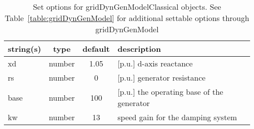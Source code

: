 \begin{table}[ht]
\centering
\begin{tabular}{p{5cm} c c p{7cm}}
\hline
string(s) & type & default & description \\
\hline
xd & number & 1.05 & [p.u.] d-axis reactance\\
rs & number & 0 & [p.u.] generator resistance\\
base & number & 100 & [p.u.]  the operating base of the generator\\
kw & number & 13 & speed gain for the damping system\\
\hline
\end{tabular}
\caption{Set options for gridDynGenModelClassical objects. See Table~\ref{table:gridDynGenModel} for additional settable options through gridDynGenModel}
\label{table:gridDynGenModelClassical}
\end{table}

